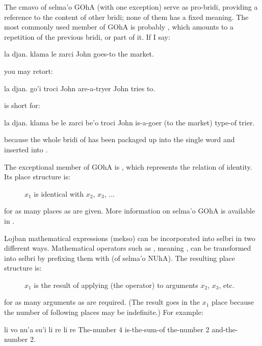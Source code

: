 The cmavo of selma'o GOhA (with one exception) serve as
    pro-bridi, providing a reference to the content of other bridi;
    none of them has a fixed meaning. The most commonly used member
    of GOhA is probably , which amounts to a repetition of
    the previous bridi, or part of it. If I say:
\begin{example}
la djan. klama le zarci\n
John goes-to the market.
\end{example}

{\noindent}you may retort:
\begin{example}
la djan. go'i troci\n
John  are-a-tryer\n
John tries to.
\end{example}

 is short for:
\begin{example}
la djan. klama be le zarci be'o troci\n
John is-a-goer (to the market) type-of trier.
\end{example}

{\noindent}because the whole bridi of  has
    been packaged up into the single word  and inserted
    into . 

The exceptional member of GOhA is , which represents
    the relation of identity. Its place structure is:
\begin{description}
\item[] $x_1$ is identical with $x_2$, $x_3$, ...
\end{description}

for as many places as are given. More information on selma'o
    GOhA is available in . 

Lojban mathematical expressions (mekso) can be incorporated
    into selbri in two different ways. Mathematical operators such
    as , meaning , can be transformed into selbri
    by prefixing them with  (of selma'o NUhA). The
    resulting place structure is:
\begin{description}
\item[] $x_1$ is the result of applying (the operator) to arguments $x_2$, $x_3$, etc.
\end{description}

for as many arguments as are required. (The result goes in the
    $x_1$ place because the number of following places may be
    indefinite.) For example:
\begin{example}
li vo nu'a su'i li re li re\n
The-number 4 is-the-sum-of the-number 2 and-the-number 2.
\end{example}

